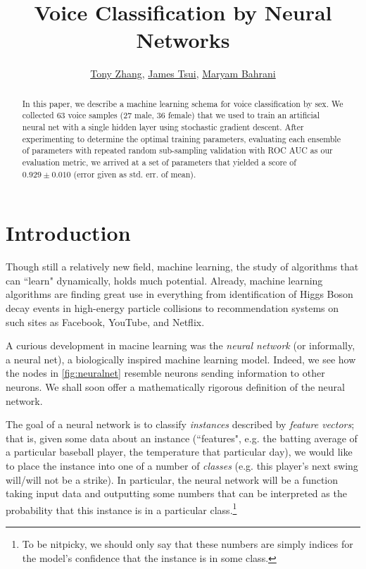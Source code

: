 \documentclass[10pt]{article}
\title{Voice Classification by Neural Networks}
\author{
	\href{mailto:txz@mit.edu}{Tony Zhang},
	\href{mailto:jtsui@hotchkiss.org}{James Tsui},
	\href{mailto:mbahrani@hotchkiss.org}{Maryam Bahrani}
}
\begin{document}
\maketitle

\begin{abstract}

In this paper, we describe a machine learning schema for voice classification by sex.
We collected 63 voice samples (27 male, 36 female) that we used to train an artificial neural net with a single hidden layer using stochastic gradient descent.
After experimenting to determine the optimal training parameters, evaluating each ensemble of parameters with repeated random sub-sampling validation with ROC AUC as our evaluation metric, we arrived at a set of parameters that yielded a score of $0.929 \pm 0.010$ (error given as std. err. of mean).
\end{abstract}

\section{Introduction}


Though still a relatively new field, machine learning, the study of algorithms that can ``learn" dynamically, holds much potential.
Already, machine learning algorithms are finding great use in everything from identification of Higgs Boson decay events in high-energy particle collisions to recommendation systems on such sites as Facebook, YouTube, and Netflix.

A curious development in macine learning was the \emph{neural network} (or informally, a neural net), a biologically inspired machine learning model.
Indeed, we see how the nodes in \cref{fig:neuralnet} resemble neurons sending information to other neurons.
We shall soon offer a mathematically rigorous definition of the neural network.

The goal of a neural network is to classify \emph{instances} described by \emph{feature vectors}; that is, given some data about an instance (``features", e.g. the batting average of a particular baseball player, the temperature that particular day), we would like to place the instance into one of a number of \emph{classes} (e.g. this player's next swing will/will not be a strike).
In particular, the neural network will be a function taking input data and outputting some numbers that can be interpreted as the probability that this instance is in a particular class.\footnote{To be nitpicky, we should only say that these numbers are simply indices for the model's confidence that the instance is in some class.}
\end{document}
